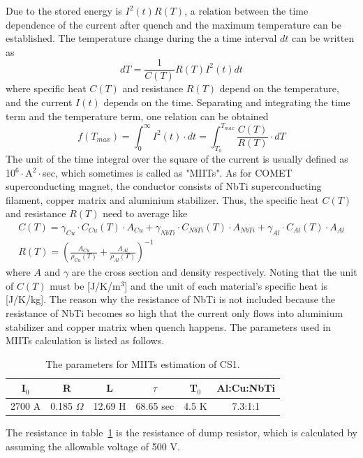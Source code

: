 Due to the stored energy is $I^2(t)R(T)$, a relation between the time dependence of the current after quench and the maximum temperature can be established.
The temperature change during the a time interval $dt$ can be written as
\begin{equation}
 dT = \frac{1}{C(T)} R(T) I^2(t) dt
\end{equation}
where specific heat $C(T)$ and resistance $R(T)$ depend on the temperature, and the current $I(t)$ depends on the time.
Separating and integrating the time term and the temperature term, one relation can be obtained
\begin{equation}
 f(T_{max}) = \int^{\infty}_0 I^2(t) \cdot dt = \int^{T_{max}}_{T_0} \frac{C(T)}{R(T)} \cdot dT
\end{equation}
The unit of the time integral over the square of the current is usually defined as 10$^6\cdot$A$^2\cdot$sec, which sometimes is called as "MIITs".
As for COMET superconducting magnet, the conductor consists of NbTi superconducting filament, copper matrix and aluminium stabilizer.
Thus, the specific heat $C(T)$ and resistance $R(T)$ need to average like
\begin{gather}
 C(T) = \gamma_{Cu} \cdot C_{Cu}(T) \cdot A_{Cu} + \gamma_{NbTi} \cdot C_{NbTi}(T) \cdot A_{NbTi} + \gamma_{Al} \cdot C_{Al}(T) \cdot A_{Al} \\
 R(T) = (\frac{A_{Cu}}{\rho_{Cu}(T)} + \frac{A_{Al}}{\rho_{Al}(T)})^{-1}
\end{gather}
where $A$ and $\gamma$ are the cross section and density respectively.
Noting that the unit of $C(T)$ must be [J/K/m$^3$] and the unit of each material's specific heat is [J/K/kg].
The reason why the resistance of NbTi is not included because the resistance of NbTi becomes so high that the current only flows into aluminium stabilizer and copper matrix when quench happens.
The parameters used in MIITs calculation is listed as follows.
\begin{table}[H]
 \centering
 \begin{tabular}{cccccc} \hline \hline
  I$_0$ & R & L & $\tau$ & T$_0$ & Al:Cu:NbTi \\ \hline
  2700 A & 0.185 $\Omega$ & 12.69 H & 68.65 sec & 4.5 K & 7.3:1:1 \\ \hline \hline
 \end{tabular}
 \caption{The parameters for MIITs estimation of CS1.}
 \label{miitspara}
\end{table}
The resistance in table~\ref{miitspara} is the resistance of dump resistor, which is calculated by assuming the allowable voltage of 500 V.
